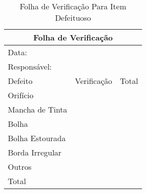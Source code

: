 \documentclass{article}
\begin{document}
\begin{table}[h!]
\centering
\caption{Folha de Verificação Para Item Defeituoso }
\begin{tabular}{|llllll|}
\hline
\multicolumn{6}{|c|}{Folha de Verificação}                                                                                                                         \\ \hline
\multicolumn{6}{|l|}{Data:}                                                                                                                                        \\ \hline
\multicolumn{6}{|l|}{Responsável:}                                                                                                                                 \\ \hline
\multicolumn{1}{|l|}{Defeito}         & \multicolumn{4}{c|}{Verificação}                                                              & \multicolumn{1}{c|}{Total} \\ \hline
\multicolumn{1}{|l|}{Orifício}        & \multicolumn{1}{l|}{} & \multicolumn{1}{l|}{} & \multicolumn{1}{l|}{} & \multicolumn{1}{l|}{} &                            \\ \hline
\multicolumn{1}{|l|}{Mancha de Tinta} & \multicolumn{1}{c|}{} & \multicolumn{1}{l|}{} & \multicolumn{1}{l|}{} & \multicolumn{1}{l|}{} &                            \\ \hline
\multicolumn{1}{|l|}{Bolha}           & \multicolumn{1}{c|}{} & \multicolumn{1}{c|}{} & \multicolumn{1}{l|}{} & \multicolumn{1}{l|}{} &                            \\ \hline
\multicolumn{1}{|l|}{Bolha Estourada} & \multicolumn{1}{l|}{} & \multicolumn{1}{l|}{} & \multicolumn{1}{l|}{} & \multicolumn{1}{l|}{} &                            \\ \hline
\multicolumn{1}{|l|}{Borda Irregular} & \multicolumn{1}{l|}{} & \multicolumn{1}{l|}{} & \multicolumn{1}{l|}{} & \multicolumn{1}{l|}{} &                            \\ \hline
\multicolumn{1}{|l|}{Outros}          & \multicolumn{1}{l|}{} & \multicolumn{1}{l|}{} & \multicolumn{1}{l|}{} & \multicolumn{1}{l|}{} &                            \\ \hline
\multicolumn{1}{|l|}{Total}           & \multicolumn{1}{l|}{} & \multicolumn{1}{l|}{} & \multicolumn{1}{l|}{} & \multicolumn{1}{l|}{} &                            \\ \hline
\end{tabular}
\end{table}
\end{document}

